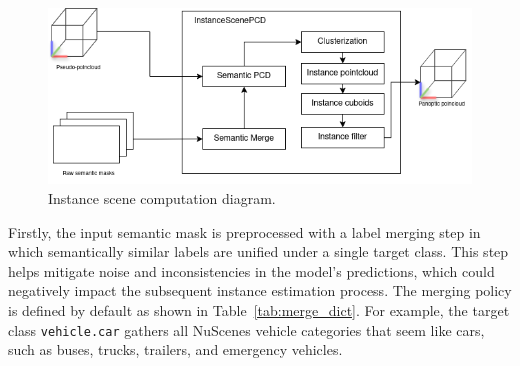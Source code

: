 \begin{figure}[h!]
    \centering
    \includegraphics[width=0.6\linewidth]{images/methodology/instance_scene_flow_diagram.png}
    \caption{Instance scene computation diagram.}
    \label{fig:instance_scene_diagram}
\end{figure}

Firstly, the input semantic mask is preprocessed with a label merging step in which semantically similar labels are unified under a single target class. This step helps mitigate noise and inconsistencies in the model's predictions, which could negatively impact the subsequent instance estimation process. The merging policy is defined by default as shown in Table~\ref{tab:merge_dict}. For example, the target class \texttt{vehicle.car} gathers all NuScenes vehicle categories that seem like cars, such as buses, trucks, trailers, and emergency vehicles.

